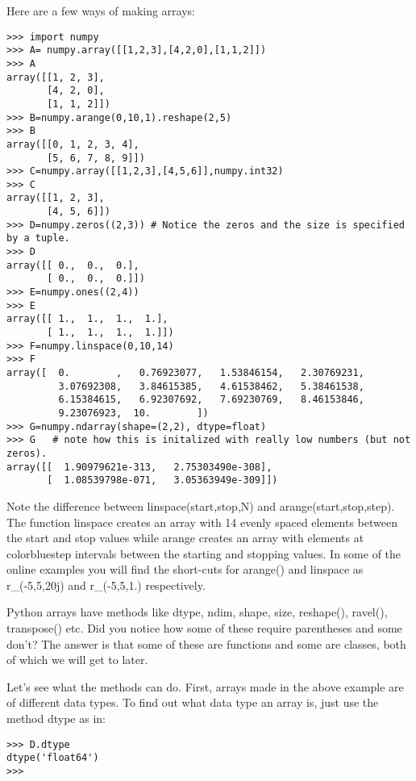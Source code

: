 { Here are a few ways of making arrays:  
{\singlespacing \color{blue} \begin{verbatim}
>>> import numpy
>>> A= numpy.array([[1,2,3],[4,2,0],[1,1,2]])
>>> A
array([[1, 2, 3],
       [4, 2, 0],
       [1, 1, 2]])
>>> B=numpy.arange(0,10,1).reshape(2,5)
>>> B
array([[0, 1, 2, 3, 4],
       [5, 6, 7, 8, 9]])
>>> C=numpy.array([[1,2,3],[4,5,6]],numpy.int32) 
>>> C
array([[1, 2, 3],
       [4, 5, 6]])
>>> D=numpy.zeros((2,3)) # Notice the zeros and the size is specified by a tuple.
>>> D
array([[ 0.,  0.,  0.],
       [ 0.,  0.,  0.]])
>>> E=numpy.ones((2,4))
>>> E
array([[ 1.,  1.,  1.,  1.],
       [ 1.,  1.,  1.,  1.]])
>>> F=numpy.linspace(0,10,14)
>>> F
array([  0.        ,   0.76923077,   1.53846154,   2.30769231,
         3.07692308,   3.84615385,   4.61538462,   5.38461538,
         6.15384615,   6.92307692,   7.69230769,   8.46153846,
         9.23076923,  10.        ])      
>>> G=numpy.ndarray(shape=(2,2), dtype=float) 
>>> G   # note how this is initalized with really low numbers (but not zeros).
array([[  1.90979621e-313,   2.75303490e-308],
       [  1.08539798e-071,   3.05363949e-309]])         
\end{verbatim}}

Note the difference between {\color{blue}linspace(start,stop,N)} and {\color{blue}arange(start,stop,step)}. The function {\color{blue}linspace} creates an array with 14 evenly spaced elements between the start and stop values while  {\color{blue}arange} creates an array with elements at {color{blue}step} intervals between the starting and stopping values.    In some of the online examples you will find the short-cuts for {\color{blue}arange()} and {\color{blue}linspace} as  {\color{blue}r\_(-5,5,20j)} and {\color{blue}r\_(-5,5,1.)} respectively.

Python arrays have methods like {\color{blue}dtype},  {\color{blue}ndim}, {\color{blue}shape}, {\color{blue}size}, {\color{blue}reshape()}, {\color{blue}ravel()},  {\color{blue}transpose()} etc.    Did you notice how some of these require parentheses and some don't? The answer is that some of these are functions and some are classes, both of which we will get to later.  

Let's see what the methods can do. 
First,  arrays made in the above example are of different data types. To find out what data type an array is, just use the method {\color{blue}dtype} as in:

{\singlespacing \color{blue} \begin{verbatim}
>>> D.dtype
dtype('float64')
>>>
\end{verbatim}}



}
